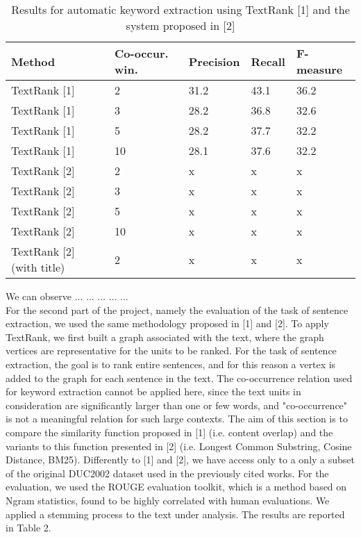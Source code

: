 \documentclass[twoside,twocolumn]{article}
\begin{document}
\begin{table*}[t]
  \centering
  \begin{tabular}{| l  l  l  l  l |}
  \hline
    \textbf{Method} & \textbf{Co-occur. win.} & \textbf{Precision} & \textbf{Recall} & \textbf{F-measure} \\ \hline
    TextRank [1] & 2 & 31.2 & 43.1 & 36.2\\ \hline
    TextRank [1] & 3 & 28.2 & 36.8 & 32.6 \\ \hline
    TextRank [1] & 5 & 28.2 & 37.7 & 32.2\\ \hline
    TextRank [1] & 10 & 28.1 & 37.6 & 32.2 \\ \hline \hline
    TextRank [2] & 2 & x & x & x\\ \hline
    TextRank [2] & 3 & x & x & x \\ \hline
    TextRank [2] & 5 & x & x & x\\ \hline
    TextRank [2] & 10 & x & x & x \\ \hline \hline
    TextRank [2] \small(with title) & 2 & x & x & x \\ \hline
  \end{tabular}
  \caption{Results for automatic keyword extraction using TextRank [1] and the system proposed in [2]}
  \label{tab:1}
\end{table*}

We can observe ... ... ... ... ...  \\
For the second part of the project, namely the evaluation of the task of sentence extraction, we used the same methodology proposed in [1] and [2]. To apply TextRank, we first built a graph associated with the text, where the graph vertices are representative for the units to be ranked. For the task of sentence extraction, the goal is to rank entire sentences, and for this reason a vertex is added to the graph for each sentence in the text. The co-occurrence relation used for keyword extraction cannot be applied here, since the text units in consideration are significantly larger than one or few words, and "co-occurrence" is not a meaningful relation for such large contexts. The aim of this section is to compare the similarity function proposed in [1] (i.e. content overlap) and the variants to this function presented in [2] (i.e. Longest Common Substring, Cosine Distance, BM25). Differently to [1] and [2], we have access only to a only a subset of the original DUC2002 dataset used in the previously cited works. For the evaluation, we used the ROUGE evaluation toolkit, which is a method based on Ngram statistics, found to be highly correlated with human evaluations. We applied a stemming process to the text under analysis. The results are reported in Table 2. 
\end{document}
